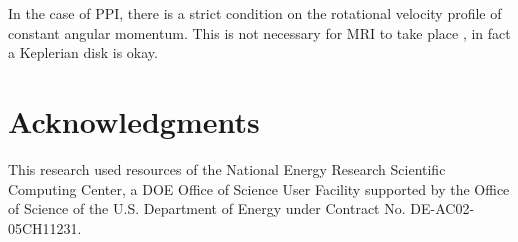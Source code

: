 \documentclass[iop,revtex4]{emulateapj}
\begin{document}
	
In the case of \ac{PPI}, there is a strict condition on the rotational velocity profile of constant angular momentum. This is not necessary for \ac{MRI} to take place , in fact a Keplerian disk is okay. 
	
\acknowledgments
\section*{Acknowledgments}
This research used resources of the National Energy Research Scientific Computing Center, a DOE Office of Science User Facility supported by the Office of Science of the U.S. Department of Energy under Contract No. DE-AC02-05CH11231.

\end{document}
